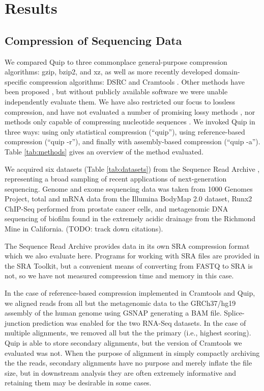 \documentclass[a4,center,fleqn]{NAR}
\begin{document}
\section{Results}
\label{section:results}

\subsection{Compression of Sequencing Data}


We compared Quip to three commonplace general-purpose compression algorithms:
gzip, bzip2, and xz, as well as more recently developed domain-specific
compression algorithms: DSRC \citep{Deorowicz2011} and Cramtools
\citep{Hsi-YangFritz2011}. Other methods have been proposed \citep{Tembe2010,
Kozanitis2011, Bhola2011}, but without publicly available software we were
unable independently evaluate them. We have also restricted our focus to
lossless compression, and have not evaluated a number of promising lossy
methods \citep{Hsi-YangFritz2011,Wan2011,Hach2012}, nor methods only capable
of compressing nucleotide sequences \citep{Cox2012}. We invoked Quip in three
ways: using only statistical compression (``quip''), using reference-based
compression (``quip -r''), and finally with assembly-based compression (``quip
-a''). Table \ref{tab:methods} gives an overview of the method evaluated.

We acquired six datasets (Table \ref{tab:datasets}) from the Sequence Read
Archive \citep{Leinonen2011}, representing a broad sampling of recent
applications of next-generation sequencing. Genome and exome sequencing data
was taken from 1000 Genomes Project, total and mRNA data from the Illumina
BodyMap 2.0 dataset, Runx2 ChIP-Seq performed from prostate cancer cells, and
metagenomic DNA sequencing of biofilm found in the extremely acidic drainage from
the Richmond Mine in California. (TODO: track down citations).

The Sequence Read Archive provides data in its own SRA compression format
which we also evaluate here. Programs for working with SRA files are provided
in the SRA Toolkit, but a convenient means of converting from FASTQ to SRA is
not, so we have not measured compression time and memory in this case.


In the case of reference-based compression implemented in Cramtools and Quip, we
aligned reads from all but the metagenomic data to the GRCh37/hg19 assembly of
the human genome using GSNAP \citep{Wu2010} generating a BAM file. Splice-
junction prediction was enabled for the two RNA-Seq datasets. In the case of
multiple alignments, we removed all but the the primary (i.e., highest
scoring). Quip is able to store secondary alignments, but the version of
Cramtools we evaluated was not. When the purpose of alignment in simply
compactly archiving the the reads, secondary alignments have no purpose and
merely inflate the file size, but in downstream analysis they are often
extremely informative and retaining them may be desirable in some cases.
\end{document}
